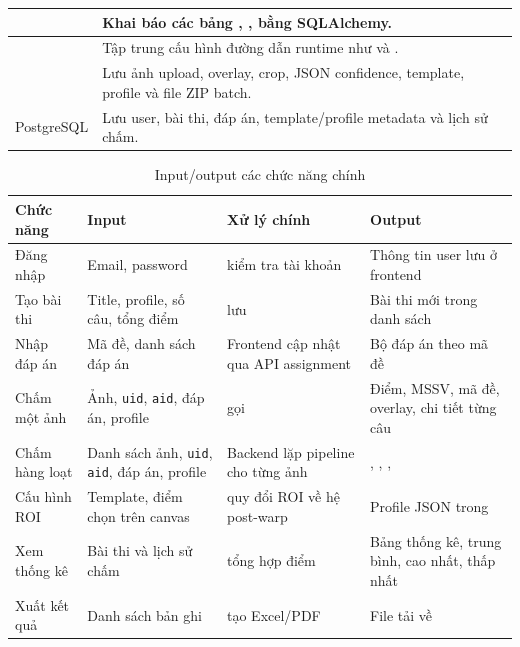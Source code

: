 \begin{longtable}{|L{5.0cm}|L{9.0cm}|}
\hline
{} & Khai báo các bảng , ,  bằng SQLAlchemy. \\
\hline
{} & Tập trung cấu hình đường dẫn runtime như  và . \\
\hline
{} & Lưu ảnh upload, overlay, crop, JSON confidence, template, profile và file ZIP batch. \\
\hline
PostgreSQL & Lưu user, bài thi, đáp án, template/profile metadata và lịch sử chấm. \\
\hline
\end{longtable}

\begin{longtable}{|L{2.8cm}|L{3.2cm}|L{4.0cm}|L{3.3cm}|}
\caption{Input/output các chức năng chính}
\label{tab:io-chuc-nang}\\
\hline
\textbf{Chức năng} & \textbf{Input} & \textbf{Xử lý chính} & \textbf{Output} \\
\hline
Đăng nhập & Email, password &  kiểm tra tài khoản & Thông tin user lưu ở frontend \\
\hline
Tạo bài thi & Title, profile, số câu, tổng điểm &  lưu  & Bài thi mới trong danh sách \\
\hline
Nhập đáp án & Mã đề, danh sách đáp án & Frontend cập nhật  qua API assignment & Bộ đáp án theo mã đề \\
\hline
Chấm một ảnh & Ảnh, \texttt{uid}, \texttt{aid}, đáp án, profile &  gọi  & Điểm, MSSV, mã đề, overlay, chi tiết từng câu \\
\hline
Chấm hàng loạt & Danh sách ảnh, \texttt{uid}, \texttt{aid}, đáp án, profile & Backend lặp pipeline cho từng ảnh & , , ,  \\
\hline
Cấu hình ROI & Template, điểm chọn trên canvas &  quy đổi ROI về hệ post-warp & Profile JSON trong  \\
\hline
Xem thống kê & Bài thi và lịch sử chấm &  tổng hợp điểm & Bảng thống kê, trung bình, cao nhất, thấp nhất \\
\hline
Xuất kết quả & Danh sách bản ghi &  tạo Excel/PDF & File tải về \\
\hline
\end{longtable}

